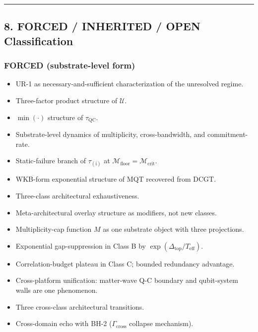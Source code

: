 \documentclass[
  11pt,
  a4paper,
]{article}
\providecommand{\tightlist}{%
  \setlength{\itemsep}{0pt}\setlength{\parskip}{0pt}}
\begin{document}
\begin{center}\rule{0.5\linewidth}{0.5pt}\end{center}

\subsection{8. FORCED / INHERITED / OPEN
Classification}\label{forced-inherited-open-classification}

\subsubsection{FORCED (substrate-level
form)}\label{forced-substrate-level-form}

\begin{itemize}
\tightlist
\item
  UR-1 as necessary-and-sufficient characterization of the unresolved
  regime.
\item
  Three-factor product structure of \(\mathcal{U}\).
\item
  \(\min(\cdot)\) structure of \(\tau_{\mathrm{QC}}\).
\item
  Substrate-level dynamics of multiplicity, cross-bandwidth, and
  commitment-rate.
\item
  Static-failure branch of \(\tau_{(\mathrm{i})}\) at
  \(\mathcal{M}_{\mathrm{floor}} = \mathcal{M}_{\mathrm{crit}}\).
\item
  WKB-form exponential structure of MQT recovered from DCGT.
\item
  Three-class architectural exhaustiveness.
\item
  Meta-architectural overlay structure as modifiers, not new classes.
\item
  Multiplicity-cap function \(M\) as one substrate object with three
  projections.
\item
  Exponential gap-suppression in Class B by
  \(\exp(\Delta_{\mathrm{top}}/T_{\mathrm{eff}})\).
\item
  Correlation-budget plateau in Class C; bounded redundancy advantage.
\item
  Cross-platform unification: matter-wave Q-C boundary and qubit-system
  walls are one phenomenon.
\item
  Three cross-class architectural transitions.
\item
  Cross-domain echo with BH-2 (\(\Gamma_{\mathrm{cross}}\) collapse
  mechanism).
\end{itemize}
\end{document}
